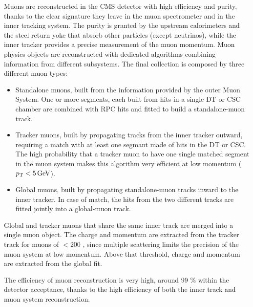 Muons are reconstructed in the CMS detector with high efficiency and purity,
thanks to the clear signature they leave in the muon spectrometer and in the inner tracking system.
The purity is granted by the upstream calorimeters and the steel return yoke that absorb other particles (except neutrinos),
while the inner tracker provides a precise measurement of the muon momentum.
Muon physics objects are reconstructed with dedicated algorithms combining information from different subsystems.
The final collection is composed by three different muon types:

\begin{itemize}
\item Standalone muons, built from the information provided by the outer Muon System.
      One or more segments, each built from hits in a single DT or CSC chamber are combined
      with RPC hits and fitted to build a standalone-muon track.
\item Tracker muons, built by propagating tracks from the inner tracker outward,
      requiring a match with at least one segmant made of hits in the DT or CSC.
      The high probability that a tracker muon to have one single matched segment in the muon system
      makes this algorithm very efficient at low momentum ($p_{\mathrm{T}} < 5 \,\text{Ge\hspace{-.08em}V}$).
\item Global muons, built by propagating standalone-muon tracks inward to the inner tracker.
      In case of match, the hits from the two different tracks are fitted jointly into a global-muon track.
\end{itemize}

Global and tracker muons that share the same inner track are merged into a single muon object.
The charge and momentum are extracted from the tracker track for muons of \PT $< 200$ \GeV,
since multiple scattering limits the precision of the muon system at low momentum.
Above that threshold, charge and momentum are extracted from the global fit.

The efficiency of muon reconstruction is very high, around 99 \% within the detector acceptance,
thanks to the high efficiency of both the inner track and muon system reconstruction.
